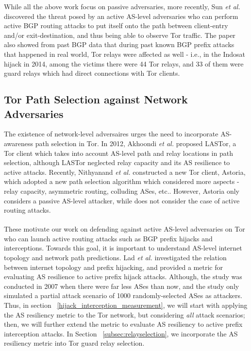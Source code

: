 While all the above work focus on passive adversaries, more recently, Sun \emph{et al.} ~\cite{sun2015raptor} discovered the threat posed by an active AS-level adversaries who can perform active BGP routing attacks to put itself onto the path between client-entry and/or exit-destination, and thus being able to observe Tor traffic. The paper also showed from past BGP data that during past known BGP prefix attacks that happened in real world, Tor relays were affected as well - i.e., in the Indosat hijack in 2014, among the victims there were 44 Tor relays, and 33 of them were guard relays which had direct connections with Tor clients. 

\subsection{Tor Path Selection against Network Adversaries}
The existence of network-level adversaires urges the need to incorporate AS-awareness path selection in Tor. In 2012, Akhoondi \emph{et al.} \cite{akhoondi2012lastor} proposed LASTor, a Tor client which takes into account AS-level path and relay locations in path selection, although LASTor neglected relay capacity and its AS resilience to active attacks. Recently, Nithyanand \emph{et al.} \cite{starov2015measuring} constructed a new Tor client, Astoria, which adopted a new path selection algorithm which considered more aspects - relay capacity, asymmetric routing, colluding ASes, etc.. However, Astoria only considers a passive AS-level attacker, while does not consider the case of active routing attacks.\\
\\
These motivate our work on defending against active AS-level adversaries on Tor who can launch active routing attacks such as BGP prefix hijacks and interceptions. Towards this goal, it is important to understand AS-level internet topology and network path predictions. Lad \emph{et al.} \cite{lad2007understanding} investigated the relation between internet topology and prefix hijacking, and provided a metric for evaluating AS resilience to active prefix hijack attacks. Although, the study was conducted in 2007 when there were far less ASes than now, and the study only simulated a partial attack scenario of 1000 randomly-selected ASes as attackers. Thus, in section ~\ref{hijack_interception_measurement}, we will start with applying the AS resiliency metric to the Tor network, but considering \emph{all} attack scenarios; then, we will further extend the metric to evaluate AS resiliency to active prefix interception attacks. In Section ~\ref{subsec:relayselection}, we incorporate the AS resiliency metric into Tor guard relay selection. 


